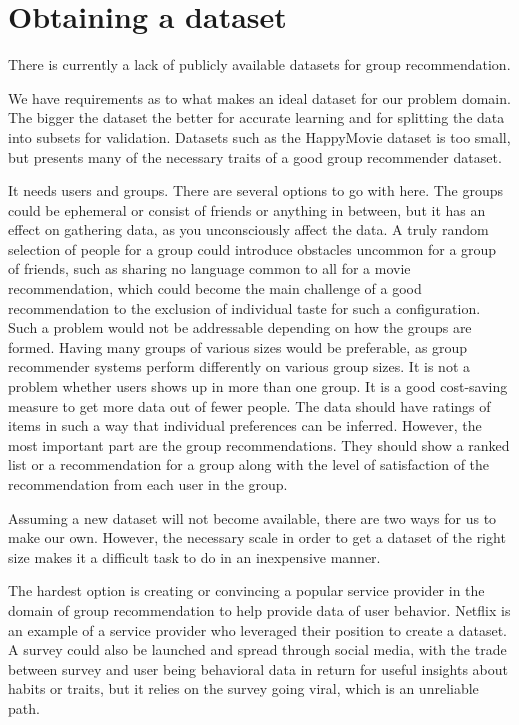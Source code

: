 \section{Obtaining a dataset}
There is currently a lack of publicly available datasets for group recommendation.

We have requirements as to what makes an ideal dataset for our problem domain. The bigger the dataset the better for accurate learning and for splitting the data into subsets for validation. Datasets such as the HappyMovie dataset \cite{HappyMovie} is too small, but presents many of the necessary traits of a good group recommender dataset.

It needs users and groups. There are several options to go with here. The groups could be ephemeral or consist of friends or anything in between, but it has an effect on gathering data, as you unconsciously affect the data. A truly random selection of people for a group could introduce obstacles uncommon for a group of friends, such as sharing no language common to all for a movie recommendation, which could become the main challenge of a good recommendation to the exclusion of individual taste for such a configuration. Such a problem would not be addressable depending on how the groups are formed. Having many groups of various sizes would be preferable, as group recommender systems perform differently on various group sizes. It is not a problem whether users shows up in more than one group. It is a good cost-saving measure to get more data out of fewer people. The data should have ratings of items in such a way that individual preferences can be inferred. However, the most important part are the group recommendations. They should show a ranked list or a recommendation for a group along with the level of satisfaction of the recommendation from each user in the group.

Assuming a new dataset will not become available, there are two ways for us to make our own. However, the necessary scale in order to get a dataset of the right size makes it a difficult task to do in an inexpensive manner.

The hardest option is creating or convincing a popular service provider in the domain of group recommendation to help provide data of user behavior. Netflix is an example of a service provider who leveraged their position to create a dataset. A survey could also be launched and spread through social media, with the trade between survey and user being behavioral data in return for useful insights about habits or traits, but it relies on the survey going viral, which is an unreliable path.

